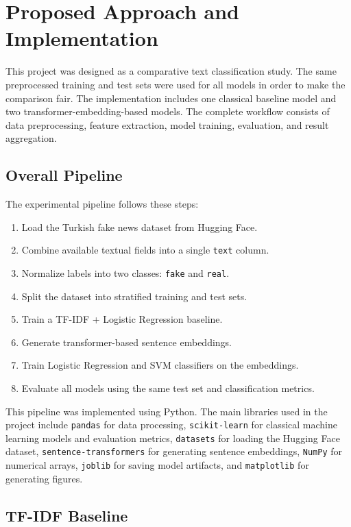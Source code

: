 \documentclass[11pt]{article}
\begin{document}
\section{Proposed Approach and Implementation}

This project was designed as a comparative text classification study. The same preprocessed training and test sets were used for all models in order to make the comparison fair. The implementation includes one classical baseline model and two transformer-embedding-based models. The complete workflow consists of data preprocessing, feature extraction, model training, evaluation, and result aggregation.

\subsection{Overall Pipeline}

The experimental pipeline follows these steps:

\begin{enumerate}
    \item Load the Turkish fake news dataset from Hugging Face.
    \item Combine available textual fields into a single \texttt{text} column.
    \item Normalize labels into two classes: \texttt{fake} and \texttt{real}.
    \item Split the dataset into stratified training and test sets.
    \item Train a TF-IDF + Logistic Regression baseline.
    \item Generate transformer-based sentence embeddings.
    \item Train Logistic Regression and SVM classifiers on the embeddings.
    \item Evaluate all models using the same test set and classification metrics.
\end{enumerate}

This pipeline was implemented using Python. The main libraries used in the project include \texttt{pandas} for data processing, \texttt{scikit-learn} for classical machine learning models and evaluation metrics, \texttt{datasets} for loading the Hugging Face dataset, \texttt{sentence-transformers} for generating sentence embeddings, \texttt{NumPy} for numerical arrays, \texttt{joblib} for saving model artifacts, and \texttt{matplotlib} for generating figures.

\subsection{TF-IDF Baseline}
\end{document}
